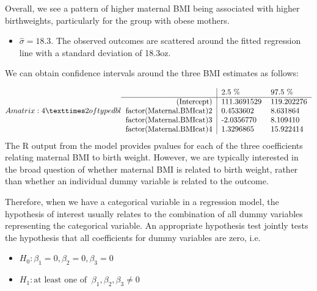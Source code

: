 \documentclass[letterpaper,10pt,english]{jupyterBook}
\begin{document}
\sphinxAtStartPar
Overall, we see a pattern of higher maternal BMI being associated with higher birthweights, particularly for the group with obese mothers.
\begin{itemize}
\item {} 
\sphinxAtStartPar
\(\hat{\sigma}=18.3\). The observed outcomes are scattered around the fitted regression line with a standard deviation of 18.3oz.

\end{itemize}

\sphinxAtStartPar
We can obtain confidence intervals around the three BMI estimates as follows:

\begin{sphinxVerbatim}[commandchars=\\\{\}]
 
\end{sphinxVerbatim}
\begin{equation*}
\begin{split}A matrix: 4 × 2 of type dbl
\begin{tabular}{r|ll}
  & 2.5 \% & 97.5 \%\\
\hline
	(Intercept) & 111.3691529 & 119.202276\\
	factor(Maternal.BMIcat)2 &   0.4533602 &   8.631864\\
	factor(Maternal.BMIcat)3 &  -2.0356770 &   8.109410\\
	factor(Maternal.BMIcat)4 &   1.3296865 &  15.922414\\
\end{tabular}\end{split}
\end{equation*}
\sphinxAtStartPar
The R output from the model provides p\sphinxhyphen{}values for each of the three coefficients relating maternal BMI to birth weight. However, we are typically interested in the broad question of whether maternal BMI is related to birth weight, rather than whether an individual dummy variable is related to the outcome.

\sphinxAtStartPar
Therefore, when we have a categorical variable in a regression model, the hypothesis of interest usually relates to the combination of all dummy variables representing the categorical variable. An appropriate hypothesis test jointly tests the hypothesis that all coefficients for dummy variables are zero, i.e.
\begin{itemize}
\item {} 
\sphinxAtStartPar
\(H_0: \beta_1 = 0, \beta_2 = 0, \beta_3 = 0\)

\item {} 
\sphinxAtStartPar
\(H_1: \text{at least one of } \ \beta_1, \beta_2, \beta_3 \neq 0\)

\end{itemize}
\end{document}
